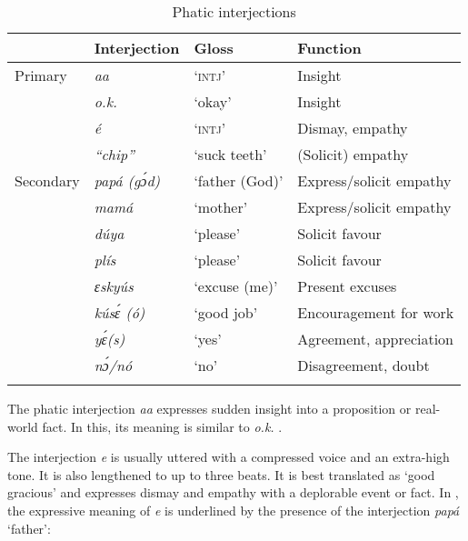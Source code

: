 \begin{table}
\caption{Phatic interjections}
\label{tab:key:12.3}

\begin{tabularx}{\textwidth}{Xlll}
\lsptoprule
 & Interjection & Gloss & Function\\
\midrule
 Primary & \itshape aa & ‘\textsc{intj}’ & Insight\\
& \itshape o.k. & ‘okay’ & Insight\\
& \itshape é & ‘\textsc{intj}’ & Dismay, empathy\\
& \itshape “chip” & ‘suck teeth’ & (Solicit) empathy\\

\tablevspace
Secondary & \itshape papá (gɔ́d) & ‘father (God)’ & Express/solicit empathy\\
& \itshape mamá & ‘mother’ & Express/solicit empathy\\
& \itshape dúya & ‘please’ & Solicit favour\\
& \itshape plís & ‘please’ & Solicit favour\\
& \itshape ɛskyús & ‘excuse (me)’ & Present excuses\\
& \itshape kúsɛ́ (ó) & ‘good job’ & Encouragement for work\\
& \itshape yɛ́(s) & ‘yes’ & Agreement, appreciation\\
& \itshape nɔ́/nó & ‘no’ & Disagreement, doubt\\
\lspbottomrule
\end{tabularx}
\end{table}
The phatic interjection \textit{aa} expresses sudden insight into a proposition or real-world fact. In this, its meaning is similar to \textit{o.k.} .


\ea%
    \label{ex:key:1648}
\z\z

The interjection \textit{e} is usually uttered with a compressed voice and an extra-high tone. It is also lengthened to up to three beats. It is best translated as ‘good gracious’ and expresses dismay and empathy with a deplorable event or fact. In , the expressive meaning of \textit{e} is underlined by the presence of the interjection \textit{papá} ‘father’:


